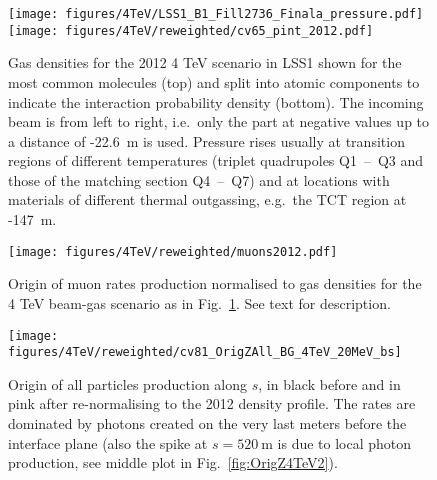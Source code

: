 \begin{figure}%
\begin{center}
  \texttt{[image: figures/4TeV/LSS1\_B1\_Fill2736\_Finala\_pressure.pdf]}
  \texttt{[image: figures/4TeV/reweighted/cv65\_pint\_2012.pdf]}
\end{center}
\vspace{-0.6cm}
 \caption{Gas densities for the 2012 4 TeV scenario in LSS1 shown for the most common molecules (top) and split into atomic components to indicate the interaction probability density (bottom). The incoming beam is from left to right, i.e.~only the part at negative values up to a distance of -22.6~m is used. Pressure rises usually at transition regions of different temperatures (triplet quadrupoles Q1~--~Q3 and those of the matching section Q4~--~Q7) and at locations with materials of different thermal outgassing, e.g.~the TCT region at -147~m.
  \label{pressure2012}}
\end{figure}

\begin{figure}%
\begin{center}
  \texttt{[image: figures/4TeV/reweighted/muons2012.pdf]}
\end{center}
\vspace{-0.6cm}
 \caption{Origin of muon rates production normalised to gas densities for the 4 TeV beam-gas scenario as in Fig.~\ref{pressure2012}. See text for description.
  \label{fig:method}}
\end{figure}


\begin{figure}
\begin{center}
  \texttt{[image: figures/4TeV/reweighted/cv81\_OrigZAll\_BG\_4TeV\_20MeV\_bs]}
\end{center}
\vspace{-0.6cm}
 \caption{Origin of all particles production along $s$, in black before and in pink after re-normalising to the 2012 density profile. The rates are dominated by photons created on the very last meters before the interface plane (also the spike at $s=520~$m is due to local photon production, see middle plot in Fig.~\ref{fig:OrigZ4TeV2}).
  \label{fig:OrigZ4TeV}}
\end{figure}

